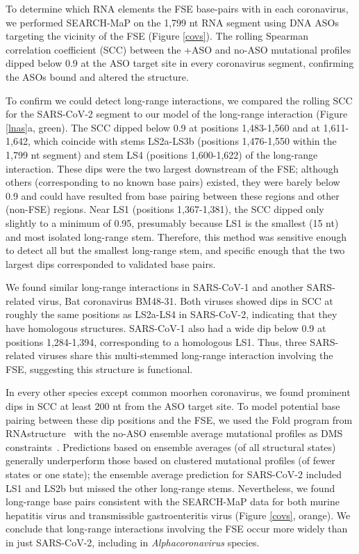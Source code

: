 \documentclass[main.tex]{subfiles}
\begin{document}
To determine which RNA elements the FSE base-pairs with in each coronavirus, we performed SEARCH-MaP on the 1,799 nt RNA segment using DNA ASOs targeting the vicinity of the FSE (Figure \ref{covs}).
The rolling Spearman correlation coefficient (SCC) between the +ASO and no-ASO mutational profiles dipped below 0.9 at the ASO target site in every coronavirus segment, confirming the ASOs bound and altered the structure.

To confirm we could detect long-range interactions, we compared the rolling SCC for the SARS-CoV-2 segment to our model of the long-range interaction (Figure \ref{lnas}a, green).
The SCC dipped below 0.9 at positions 1,483-1,560 and at 1,611-1,642, which coincide with stems LS2a-LS3b (positions 1,476-1,550 within the 1,799 nt segment) and stem LS4 (positions 1,600-1,622) of the long-range interaction.
These dips were the two largest downstream of the FSE; although others (corresponding to no known base pairs) existed, they were barely below 0.9 and could have resulted from base pairing between these regions and other (non-FSE) regions.
Near LS1 (positions 1,367-1,381), the SCC dipped only slightly to a minimum of 0.95, presumably because LS1 is the smallest (15 nt) and most isolated long-range stem.
Therefore, this method was sensitive enough to detect all but the smallest long-range stem, and specific enough that the two largest dips corresponded to validated base pairs.

We found similar long-range interactions in SARS-CoV-1 and another SARS-related virus, Bat coronavirus BM48-31.
Both viruses showed dips in SCC at roughly the same positions as LS2a-LS4 in SARS-CoV-2, indicating that they have homologous structures.
SARS-CoV-1 also had a wide dip below 0.9 at positions 1,284-1,394, corresponding to a homologous LS1.
Thus, three SARS-related viruses share this multi-stemmed long-range interaction involving the FSE, suggesting this structure is functional.

In every other species except common moorhen coronavirus, we found prominent dips in SCC at least 200 nt from the ASO target site.
To model potential base pairing between these dip positions and the FSE, we used the Fold program from RNAstructure~\cite{Mathews2004a} with the no-ASO ensemble average mutational profiles as DMS constraints~\cite{Cordero2012}.
Predictions based on ensemble averages (of all structural states) generally underperform those based on clustered mutational profiles (of fewer states or one state); the ensemble average prediction for SARS-CoV-2 included LS1 and LS2b but missed the other long-range stems.
Nevertheless, we found long-range base pairs consistent with the SEARCH-MaP data for both murine hepatitis virus and transmissible gastroenteritis virus (Figure \ref{covs}, orange).
We conclude that long-range interactions involving the FSE occur more widely than in just SARS-CoV-2, including in \textit{Alphacoronavirus} species.
\end{document}
